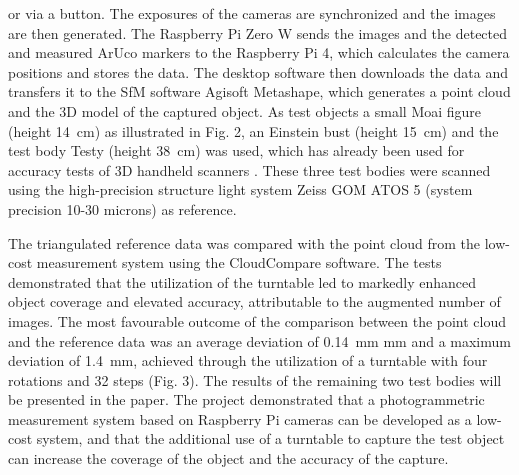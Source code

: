 \documentclass{isprs} %
\begin{document}
or via a button. The exposures of the cameras are synchronized and the images are then generated. The
Raspberry Pi Zero W sends the images and the detected and measured ArUco markers to the Raspberry Pi 4,
which calculates the camera positions and stores the data. The desktop software then downloads the data and
transfers it to the SfM software Agisoft Metashape, which generates a point cloud and the 3D model of the
captured object.
As test objects a small Moai figure (height \SI{14}{\centi\metre}) as illustrated in Fig. 2, an Einstein bust (height \SI{15}{\centi\metre}) and the
test body Testy (height \SI{38}{\centi\metre}) was used, which has already been used for accuracy tests of 3D handheld
scanners \cite{kersten_scanner}. These three test bodies were scanned using the high-precision structure light
system Zeiss GOM ATOS 5 (system precision 10-30 microns) as reference.

The triangulated reference data was compared with the point cloud from the low-cost measurement system using
the CloudCompare software. The tests demonstrated that the utilization of the turntable led to markedly
enhanced object coverage and elevated accuracy, attributable to the augmented number of images. The most
favourable outcome of the comparison between the point cloud and the reference data was an average deviation
of \SI{0.14}{\milli\metre} mm and a maximum deviation of \SI{1.4}{\milli\metre}, achieved through the utilization of a turntable with four
rotations and 32 steps (Fig. 3). The results of the remaining two test bodies will be presented in the paper. The
project demonstrated that a photogrammetric measurement system based on Raspberry Pi cameras can be
developed as a low-cost system, and that the additional use of a turntable to capture the test object can increase
the coverage of the object and the accuracy of the capture.

	{
		\begin{spacing}{1.17}
			\normalsize
		\end{spacing}
	}
\end{document}
